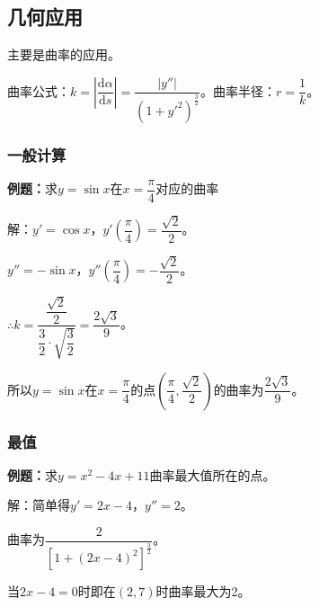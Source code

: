 \documentclass[UTF8, 12pt]{ctexart}
\begin{document}
\subsection{几何应用}

主要是曲率的应用。

曲率公式：$k=\left\lvert\dfrac{\textrm{d}\alpha}{\textrm{d}s}\right\rvert=\dfrac{\vert y''\vert}{(1+y'^2)^{\frac{3}{2}}}$。曲率半径：$r=\dfrac{1}{k}$。

\subsubsection{一般计算}

\textbf{例题：}求$y=\sin x$在$x=\dfrac{\pi}{4}$对应的曲率

解：$y'=\cos x$，$y'(\dfrac{\pi}{4})=\dfrac{\sqrt{2}}{2}$。

$y''=-\sin x$，$y''(\dfrac{\pi}{4})=-\dfrac{\sqrt{2}}{2}$。

$\therefore k=\dfrac{\dfrac{\sqrt{2}}{2}}{\dfrac{3}{2}\cdot\sqrt{\dfrac{3}{2}}}=\dfrac{2\sqrt{3}}{9}$。

所以$y=\sin x$在$x=\dfrac{\pi}{4}$的点$(\dfrac{\pi}{4},\dfrac{\sqrt{2}}{2})$的曲率为$\dfrac{2\sqrt{3}}{9}$。

\subsubsection{最值}

\textbf{例题：}求$y=x^2-4x+11$曲率最大值所在的点。

解：简单得$y'=2x-4$，$y''=2$。

曲率为$\dfrac{2}{[1+(2x-4)^2]^{\frac{3}{2}}}$。

当$2x-4=0$时即在$(2,7)$时曲率最大为2。
\end{document}
